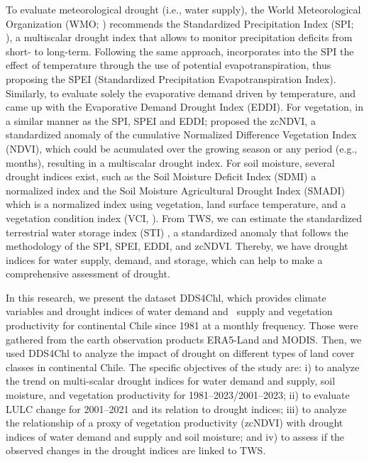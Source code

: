 \documentclass[
  number,
  preprint,
  3p]{elsarticle}
\begin{document}
To evaluate meteorological drought (i.e., water supply), the World
Meteorological Organization (WMO; \citep{WMO2012}) recommends the
Standardized Precipitation Index (SPI; \citep{Mckee1993}), a multiscalar
drought index that allows to monitor precipitation deficits from short-
to long-term. Following the same approach, \citep{Vicente-Serrano2010}
incorporates into the SPI the effect of temperature through the use of
potential evapotranspiration, thus proposing the SPEI (Standardized
Precipitation Evapotranspiration Index). Similarly, to evaluate solely
the evaporative demand driven by temperature, \citep{Hobbins2016} and
\citep{McEvoy2016} came up with the Evaporative Demand Drought Index
(EDDI). For vegetation, in a similar manner as the SPI, SPEI and EDDI;
\citep{Zambrano2018} proposed the zcNDVI, a standardized anomaly of the
cumulative Normalized Difference Vegetation Index (NDVI), which could be
acumulated over the growing season or any period (e.g., months),
resulting in a multiscalar drought index. For soil moisture, several
drought indices exist, such as the Soil Moisture Deficit Index (SDMI) a
normalized index \citep{Narasimhan2005} and the Soil Moisture
Agricultural Drought Index (SMADI) \citep{Souza2021} which is a
normalized index using vegetation, land surface temperature, and a
vegetation condition index (VCI, \citep{Kogan1995}). From TWS, we can
estimate the standardized terrestrial water storage index (STI)
\citep{Cui2021}, a standardized anomaly that follows the methodology of
the SPI, SPEI, EDDI, and zcNDVI. Thereby, we have drought indices for
water supply, demand, and storage, which can help to make a
comprehensive assessment of drought.

In this research, we present the dataset DDS4Chl, which provides climate
variables and drought indices of water demand and~ supply and vegetation
productivity for continental Chile since 1981 at a monthly frequency.
Those were gathered from the earth observation products ERA5-Land and
MODIS. Then, we used DDS4Chl to analyze the impact of drought on
different types of land cover classes in continental Chile. The specific
objectives of the study are: i) to analyze the trend on multi-scalar
drought indices for water demand and supply, soil moisture, and
vegetation productivity for 1981--2023/2001--2023; ii) to evaluate LULC
change for 2001--2021 and its relation to drought indices; iii) to
analyze the relationship of a proxy of vegetation productivity (zcNDVI)
with drought indices of water demand and supply and soil moisture; and
iv) to assess if the observed changes in the drought indices are linked
to TWS.
\end{document}
